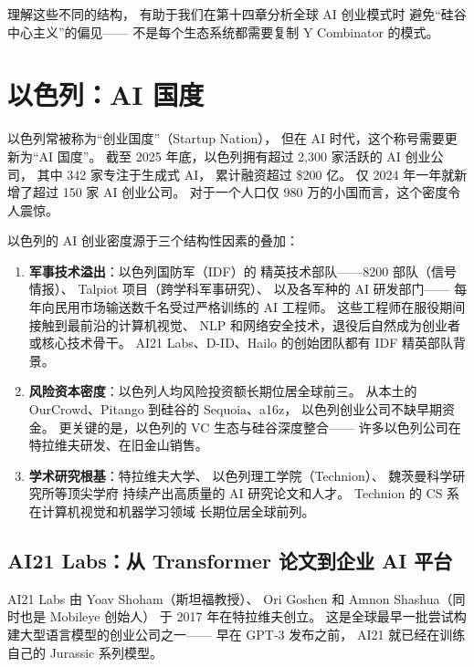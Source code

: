 理解这些不同的结构，
有助于我们在第十四章分析全球 AI 创业模式时
避免``硅谷中心主义''的偏见——
不是每个生态系统都需要复制 Y Combinator 的模式。

\section{以色列：AI 国度}
\label{sec:global-israel}

以色列常被称为``创业国度''（Startup Nation），
但在 AI 时代，这个称号需要更新为``AI 国度''。
截至 2025 年底，以色列拥有超过 2,300 家活跃的 AI 创业公司，
其中 342 家专注于生成式 AI，
累计融资超过 \$200 亿。
仅 2024 年一年就新增了超过 150 家 AI 创业公司。
对于一个人口仅 980 万的小国而言，这个密度令人震惊。

\begin{whybox}
以色列的 AI 创业密度源于三个结构性因素的叠加：
\begin{enumerate}[noitemsep]
  \item \textbf{军事技术溢出}：以色列国防军（IDF）的
        精英技术部队——8200 部队（信号情报）、
        Talpiot 项目（跨学科军事研究）、
        以及各军种的 AI 研发部门——
        每年向民用市场输送数千名受过严格训练的 AI 工程师。
        这些工程师在服役期间接触到最前沿的计算机视觉、
        NLP 和网络安全技术，退役后自然成为创业者或核心技术骨干。
        AI21 Labs、D-ID、Hailo 的创始团队都有 IDF 精英部队背景。
  \item \textbf{风险资本密度}：以色列人均风险投资额长期位居全球前三。
        从本土的 OurCrowd、Pitango 到硅谷的 Sequoia、a16z，
        以色列创业公司不缺早期资金。
        更关键的是，以色列的 VC 生态与硅谷深度整合——
        许多以色列公司在特拉维夫研发、在旧金山销售。
  \item \textbf{学术研究根基}：特拉维夫大学、
        以色列理工学院（Technion）、
        魏茨曼科学研究所等顶尖学府
        持续产出高质量的 AI 研究论文和人才。
        Technion 的 CS 系在计算机视觉和机器学习领域
        长期位居全球前列。
\end{enumerate}
\end{whybox}

\subsection{AI21 Labs：从 Transformer 论文到企业 AI 平台}

AI21 Labs 由 Yoav Shoham（斯坦福教授）、
Ori Goshen 和 Amnon Shashua（同时也是 Mobileye 创始人）
于 2017 年在特拉维夫创立。
这是全球最早一批尝试构建大型语言模型的创业公司之一——
早在 GPT-3 发布之前，
AI21 就已经在训练自己的 Jurassic 系列模型。

